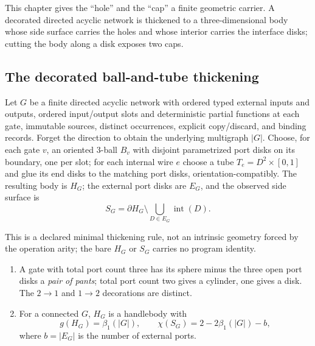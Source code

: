 
This chapter gives the ``hole'' and the ``cap'' a finite geometric carrier.  A
decorated directed acyclic network is thickened to a three-dimensional body
whose side surface carries the holes and whose interior carries the interface
disks; cutting the body along a disk exposes two caps.

\subsection{The decorated ball-and-tube thickening}

\begin{definition}
\label{def:decorated-ball-tube-thickening}
Let $G$ be a finite directed acyclic network with ordered typed external inputs
and outputs, ordered input/output slots and deterministic partial functions at
each gate, immutable sources, distinct occurrences, explicit copy/discard, and
binding records.  Forget the direction to obtain the underlying multigraph
$|G|$.  Choose, for each gate $v$, an oriented $3$-ball $B_v$ with disjoint
parametrized port disks on its boundary, one per slot; for each internal wire
$e$ choose a tube $T_e=D^2\times[0,1]$ and glue its end disks to the matching
port disks, orientation-compatibly.  The resulting body is $H_G$; the external
port disks are $E_G$, and the observed side surface is
\[
  S_G=\partial H_G\setminus\bigcup_{D\in E_G}\operatorname{int}(D).
\]
\end{definition}

This is a declared minimal thickening rule, not an intrinsic geometry forced by
the operation arity; the bare $H_G$ or $S_G$ carries no program identity.

\begin{proposition}
\label{prop:local-pants-handlebody-genus}
\begin{enumerate}
  \item A gate with total port count three has its sphere minus the three open
  port disks a \emph{pair of pants}; total port count two gives a cylinder, one
  gives a disk.  The $2\to1$ and $1\to2$ decorations are distinct.
  \item For a connected $G$, $H_G$ is a handlebody with
  \[
    g(H_G)=\beta_1(|G|),
    \qquad
    \chi(S_G)=2-2\beta_1(|G|)-b,
  \]
  where $b=|E_G|$ is the number of external ports.
\end{enumerate}
\end{proposition}

